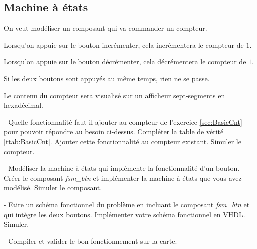 \subsection{Machine à états}
On veut modéliser un composant qui va commander un compteur.

Lorsqu'on appuie sur le bouton incrémenter, cela incrémentera le compteur de $1$.

Lorsqu'on appuie sur le bouton décrémenter, cela décrémentera le compteur de $1$.

Si les deux boutons sont appuyés au même temps, rien ne se passe.

Le contenu du compteur sera visualisé sur un afficheur sept-segments en hexadécimal.

\medskip

- Quelle fonctionnalité faut-il ajouter au compteur de l’exercice \ref{sec:BasicCnt} pour pouvoir répondre au besoin ci-dessus. Compléter la table de vérité \ref{ttab:BasicCnt}. Ajouter cette fonctionnalité au compteur existant. Simuler le compteur.

\medskip

- Modéliser la machine à états qui implémente la fonctionnalité d'un bouton. Créer le composant \textit{fsm\_btn} et implémenter la machine à états que vous avez modélisé. Simuler le composant.

\medskip

- Faire un schéma fonctionnel du problème en incluant le composant \textit{fsm\_btn} et qui intègre les deux boutons. Implémenter votre schéma fonctionnel en VHDL. Simuler.

\medskip

- Compiler et valider le bon fonctionnement sur la carte.
